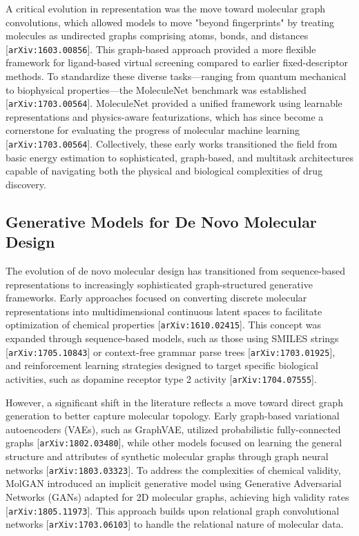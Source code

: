 \documentclass[11pt]{article}
\begin{document}
A critical evolution in representation was the move toward molecular graph convolutions, which allowed models to move "beyond fingerprints" by treating molecules as undirected graphs comprising atoms, bonds, and distances [\texttt{arXiv:1603.00856}]. This graph-based approach provided a more flexible framework for ligand-based virtual screening compared to earlier fixed-descriptor methods. To standardize these diverse tasks—ranging from quantum mechanical to biophysical properties—the MoleculeNet benchmark was established [\texttt{arXiv:1703.00564}]. MoleculeNet provided a unified framework using learnable representations and physics-aware featurizations, which has since become a cornerstone for evaluating the progress of molecular machine learning [\texttt{arXiv:1703.00564}]. Collectively, these early works transitioned the field from basic energy estimation to sophisticated, graph-based, and multitask architectures capable of navigating both the physical and biological complexities of drug discovery.

\subsection{Generative Models for De Novo Molecular Design}

The evolution of de novo molecular design has transitioned from sequence-based representations to increasingly sophisticated graph-structured generative frameworks. Early approaches focused on converting discrete molecular representations into multidimensional continuous latent spaces to facilitate optimization of chemical properties [\texttt{arXiv:1610.02415}]. This concept was expanded through sequence-based models, such as those using SMILES strings [\texttt{arXiv:1705.10843}] or context-free grammar parse trees [\texttt{arXiv:1703.01925}], and reinforcement learning strategies designed to target specific biological activities, such as dopamine receptor type 2 activity [\texttt{arXiv:1704.07555}].

However, a significant shift in the literature reflects a move toward direct graph generation to better capture molecular topology. Early graph-based variational autoencoders (VAEs), such as GraphVAE, utilized probabilistic fully-connected graphs [\texttt{arXiv:1802.03480}], while other models focused on learning the general structure and attributes of synthetic molecular graphs through graph neural networks [\texttt{arXiv:1803.03323}]. To address the complexities of chemical validity, MolGAN introduced an implicit generative model using Generative Adversarial Networks (GANs) adapted for 2D molecular graphs, achieving high validity rates [\texttt{arXiv:1805.11973}]. This approach builds upon relational graph convolutional networks [\texttt{arXiv:1703.06103}] to handle the relational nature of molecular data.
\end{document}
